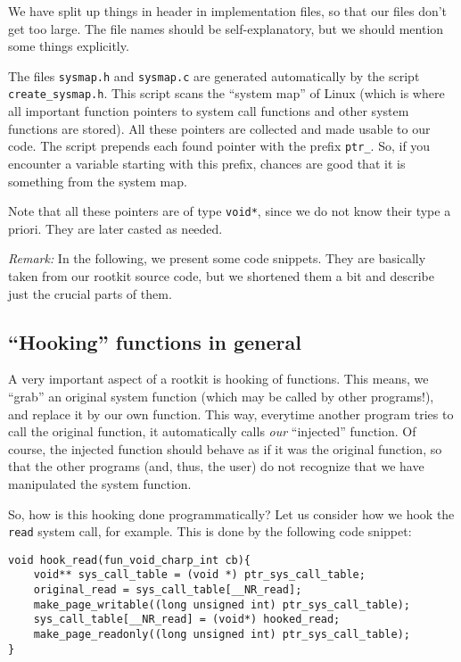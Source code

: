 \documentclass[10pt, letterpaper]{article}
\begin{document}
We have split up things in header in implementation files, so
that our files don't get too large. The file names should be self-explanatory, but we should mention some things explicitly.

The files \texttt{sysmap.h} and \texttt{sysmap.c} are generated automatically by the script \linebreak \texttt{create\_sysmap.h}. This script scans the ``system map'' of Linux (which is where all important function pointers to system call functions and other system functions are stored). All these pointers are collected and made usable to our code. The script prepends each found pointer with the prefix \texttt{ptr\_}. So, if you encounter a variable starting with this prefix, chances are good that it is something from the system map.

Note that all these pointers are of type \texttt{void*}, since we do not know their type a priori. They are later casted as needed.

\emph{Remark:} In the following, we present some code snippets. They are basically taken from our rootkit source code, but we shortened them a bit and describe just the crucial parts of them.

\subsection{``Hooking'' functions in general}

A very important aspect of a rootkit is hooking of functions. This means, we ``grab'' an original system function (which may be called by other programs!), and replace it by our own function. This way, everytime another program tries to call the original function, it automatically calls \emph{our} ``injected'' function. Of course, the injected function should behave as if it was the original function, so that the other programs (and, thus, the user) do not recognize that we have manipulated the system function.

So, how is this hooking done programmatically? Let us consider how we hook the \texttt{read} system call, for example. This is done by the following code snippet:

\begin{verbatim}
void hook_read(fun_void_charp_int cb){
    void** sys_call_table = (void *) ptr_sys_call_table;
    original_read = sys_call_table[__NR_read];
    make_page_writable((long unsigned int) ptr_sys_call_table);
    sys_call_table[__NR_read] = (void*) hooked_read;
    make_page_readonly((long unsigned int) ptr_sys_call_table);
}
\end{verbatim}
\end{document}
